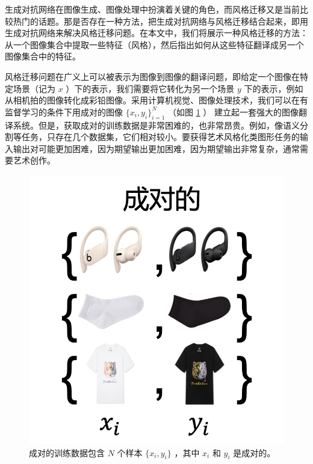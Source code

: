 \documentclass[conference]{IEEEtran}
\begin{document}
生成对抗网络在图像生成、图像处理中扮演着关键的角色，而风格迁移又是当前比较热门的话题。那是否存在一种方法，把生成对抗网络与风格迁移结合起来，即用生成对抗网络来解决风格迁移问题。在本文中，我们将展示一种风格迁移的方法：从一个图像集合中提取一些特征（风格），然后指出如何从这些特征翻译成另一个图像集合中的特征。

风格迁移问题在广义上可以被表示为图像到图像的翻译问题，即给定一个图像在特定场景（记为 $x$ ）下的表示，我们需要将它转化为另一个场景 $y$ 下的表示，例如从相机拍的图像转化成彩铅图像。采用计算机视觉、图像处理技术，我们可以在有监督学习的条件下用成对的图像 $\{x_i, y_i\}_{i=1}^{N}$ （如图 \ref{l1} ） 建立起一套强大的图像翻译系统。但是，获取成对的训练数据是非常困难的，也非常昂贵。例如，像语义分割等任务，只存在几个数据集，它们相对较小。要获得艺术风格化类图形任务的输入输出对可能更加困难，因为期望输出更加困难，因为期望输出非常复杂，通常需要艺术创作。

\begin{figure}
\centering
\includegraphics[scale=0.5]{img/1.png}
\caption{成对的训练数据包含 $N$ 个样本 $\{x_i, y_i\}$ ，其中 $x_i$ 和 $y_i$ 是成对的。}
\label{l1}
\end{figure}
\end{document}
